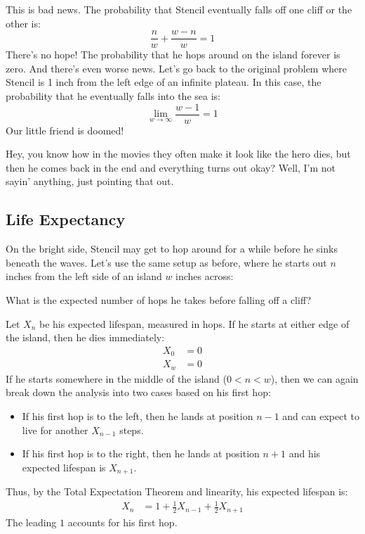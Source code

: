 This is bad news.  The probability that Stencil eventually falls off
one cliff or the other is:
%
\[
\frac{n}{w} + \frac{w - n}{w} = 1
\]
%
There's no hope!  The probability that he hops around on the island
forever is zero.  And there's even worse news.  Let's go back to the
original problem where Stencil is 1 inch from the left edge of an
infinite plateau.  In this case, the probability that he eventually
falls into the sea is:
%
\[
\lim_{w \to \infty} \frac{w - 1}{w} = 1
\]
%
Our little friend is doomed!

Hey, you know how in the movies they often make it look like the hero
dies, but then he comes back in the end and everything turns out okay?
Well, I'm not sayin' anything, just pointing that out.


\subsection{Life Expectancy}

On the bright side, Stencil may get to hop around for a while before
he sinks beneath the waves.  Let's use the same setup as before, where
he starts out $n$ inches from the left side of an island $w$ inches
across:
%
\begin{figure}[h]
\end{figure}
%
What is the expected number of hops he takes before falling off a cliff?

Let $X_n$ be his expected lifespan, measured in hops.  If he starts at
either edge of the island, then he dies immediately:
%
\begin{align*}
X_0 & = 0 \\
X_w & = 0
\end{align*}
%
If he starts somewhere in the middle of the island ($0 < n < w$), then
we can again break down the analysis into two cases based on his first
hop:
%
\begin{itemize}

\item If his first hop is to the left, then he lands at position $n-1$
and can expect to live for another $X_{n-1}$ steps.

\item If his first hop is to the right, then he lands at position
$n+1$ and his expected lifespan is $X_{n+1}$.

\end{itemize}
%
Thus, by the Total Expectation Theorem and linearity, his expected
lifespan is:
%
\begin{align*}
X_n & = 1 + \frac{1}{2} X_{n-1} + \frac{1}{2} X_{n+1}
\end{align*}
%
The leading $1$ accounts for his first hop.

